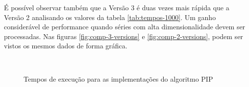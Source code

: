 É possível observar também que a Versão 3 é duas vezes mais rápida que a Versão 2 analisando os valores da tabela \ref{tab:tempos-1000}. Um ganho considerável de performance quando séries com alta dimensionalidade  devem ser processadas. Nas figuras \ref{fig:comp-3-versions} e \ref{fig:comp-2-versions}, podem ser vistos os mesmos dados de forma gráfica.

\begin{figure}[htb!]
  \begin{center}
    \\
    \centering
    \caption[Comparativo entre as 3 versões implementadas]{Tempos de execução para as implementações do algoritmo PIP}
    \label{fig:comparativo}
  \end{center}
\end{figure}
